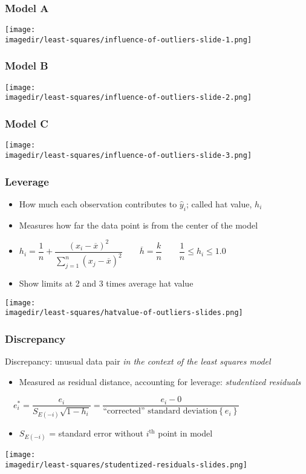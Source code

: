 \begin{frame}\frametitle{Model A}
	\begin{center}
		\texttt{[image: \\imagedir/least-squares/influence-of-outliers-slide-1.png]}
	\end{center}
\end{frame}

\begin{frame}\frametitle{Model B}
	\begin{center}
		\texttt{[image: \\imagedir/least-squares/influence-of-outliers-slide-2.png]}
	\end{center}
\end{frame}

\begin{frame}\frametitle{Model C}
	\begin{center}
		\texttt{[image: \\imagedir/least-squares/influence-of-outliers-slide-3.png]}
	\end{center}
\end{frame}

\begin{frame}\frametitle{Leverage}
	\begin{itemize}
		\item	How much each observation contributes to $\hat{y}_i$; called hat value, $h_i$ 
		\item	Measures how far the data point is from the center of the model 
		\item	$ h_i = \dfrac{1}{n} + \dfrac{\left(x_i -\overline{x}\right)^2}{\sum_{j=1}^{n}{\left(x_j -\overline{x}\right)^2}} \qquad \overline{h} = \dfrac{k}{n} \qquad \dfrac{1}{n} \leq h_i \leq 1.0$ 
		\item	Show limits at 2 and 3 times average hat value 
	\end{itemize}
	\begin{center}
		\texttt{[image: \\imagedir/least-squares/hatvalue-of-outliers-slides.png]}
	\end{center}
\end{frame}

\begin{frame}\frametitle{Discrepancy}
	
	Discrepancy: unusual data pair \emph{in the context of the least squares model} 
	\begin{itemize}
		\item	Measured as residual distance, accounting for leverage: \emph{studentized residuals} 
	\end{itemize}
	$ \quad e_i^* = \dfrac{e_i}{S_{E(-i)}\sqrt{1-h_i}} = \dfrac{e_i - 0}{\text{``corrected'' standard deviation}\left\{e_i \right\}} $
	\begin{itemize}
		\item	$S_{E(-i)}$ = standard error without $i^\text{th}$ point in model 
	\end{itemize}
	\begin{center}
		\texttt{[image: \\imagedir/least-squares/studentized-residuals-slides.png]}
	\end{center}
\end{frame}


